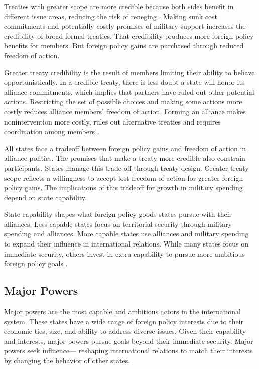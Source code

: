 \documentclass[12pt]{article}
\begin{document}
Treaties with greater scope are more credible because both sides benefit in different issue areas, reducing the risk of reneging \citep{Poast2013}. 
Making sunk cost commitments and potentially costly promises of military support increases the credibility of broad formal treaties.
That credibility produces more foreign policy benefits for members. 
But foreign policy gains are purchased through reduced freedom of action. 


Greater treaty credibility is the result of members limiting their ability to behave opportunistically. 
In a credible treaty, there is less doubt a state will honor its alliance commitments, which implies that partners have ruled out other potential actions. 
Restricting the set of possible choices and making some actions more costly reduces alliance members' freedom of action. 
Forming an alliance makes nonintervention more costly, rules out alternative treaties and requires coordination among members \citep{Snyder1997}. 


All states face a tradeoff between foreign policy gains and freedom of action in alliance politics. 
The promises that make a treaty more credible also constrain participants. 
States manage this trade-off through treaty design. 
Greater treaty scope reflects a willingness to accept lost freedom of action for greater foreign policy gains. 
The implications of this tradeoff for growth in military spending depend on state capability. 


State capability shapes what foreign policy goods states pursue with their alliances. 
Less capable states focus on territorial security through military spending and alliances. 
More capable states use alliances and military spending to expand their influence in international relations. 
While many states focus on immediate security, others invest in extra capability to pursue more ambitious foreign policy goals \citep{Fordham2011, MarkowitzFariss2017}. 


\subsection{Major Powers} 


Major powers are the most capable and ambitious actors in the international system. 
These states have a wide range of foreign policy interests due to their economic ties, size, and ability to address diverse issues. 
Given their capability and interests, major powers pursue goals beyond their immediate security. 
Major powers seek influence--- reshaping international relations to match their interests by changing the behavior of other states. 
\end{document}
